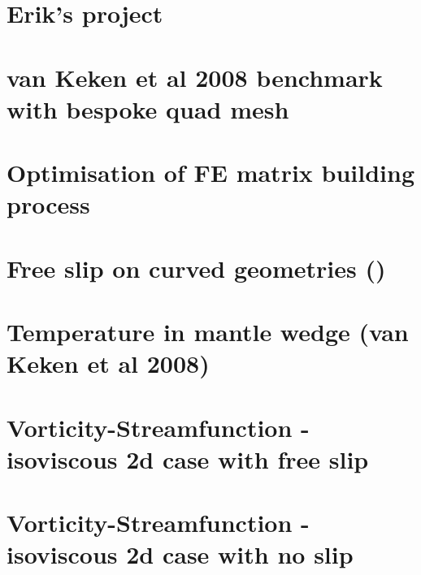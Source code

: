 \documentclass[a4paper,11pt]{report}
\begin{document}
\chapter{Erik's project \label{f148}} %

\chapter{van Keken et al 2008 benchmark with bespoke quad mesh\label{f149}} %

\chapter{Optimisation of FE matrix building process \label{f150}} %

\chapter{Free slip on curved geometries (\QtwoQone)\label{f151}} %

\chapter{Temperature in mantle wedge (van Keken et al 2008) \label{f152}} %

\chapter{Vorticity-Streamfunction - isoviscous 2d case with free slip\label{f153}} %

\chapter{Vorticity-Streamfunction - isoviscous 2d case with no slip\label{f154}} %
\end{document}
